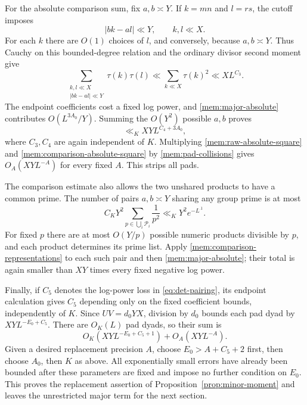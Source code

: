 For the absolute comparison sum, fix $a,b\asymp Y$. If $k=mn$ and
$l=rs$, the cutoff imposes
\[
 |bk-al|\ll Y,\qquad k,l\ll X.
\]
For each $k$ there are $O(1)$ choices of $l$, and conversely, because
$a,b\asymp Y$. Thus Cauchy on this bounded-degree relation and the
ordinary divisor second moment give
\begin{equation}\label{mem:comparison-representations}
 \sum_{\substack{k,l\ll X\\|bk-al|\ll Y}}\tau(k)\tau(l)
 \ll\sum_{k\ll X}\tau(k)^2\ll X L^{C_3}.
\end{equation}
The endpoint coefficients cost a fixed log power, and
\eqref{mem:major-absolute} contributes $O(L^{3A_0}/Y)$. Summing the
$O(Y^2)$ possible $a,b$ proves
\begin{equation}\label{mem:comparison-absolute-square}
 \ll_K XY L^{C_4+3A_0},
\end{equation}
where $C_3,C_4$ are again independent of $K$. Multiplying
\eqref{mem:raw-absolute-square} and
\eqref{mem:comparison-absolute-square} by
\eqref{mem:pad-collisions} gives $O_A(XY L^{-A})$ for every fixed
$A$. This strips all pads.

The comparison estimate also allows the two unshared products to have
a common prime.
The number of pairs $a,b\asymp Y$ sharing any group prime is at most
\begin{equation}\label{mem:unshared-collisions}
 C_KY^2\sum_{p\in\bigcup_i\mathcal P_i}\frac1{p^2}
       \ll_K Y^2e^{-L^{.1}}.
\end{equation}
For fixed $p$ there are at most $O(Y/p)$ possible numeric products
divisible by $p$, and each product determines its prime list.
Apply \eqref{mem:comparison-representations} to each such pair and
then \eqref{mem:major-absolute}; their total is again smaller than
$XY$ times every fixed negative log power.

Finally, if $C_5$ denotes the log-power loss in
\eqref{eq:det-pairing}, its endpoint calculation gives $C_5$ depending
only on the fixed coefficient bounds, independently of $K$.
Since $UV=d_0YX$, division by $d_0$ bounds each pad dyad by
$XY L^{-E_0+C_5}$. There are $O_K(L)$ pad dyads, so their sum is
\begin{equation}\label{mem:final-replacement}
 O_K(XY L^{-E_0+C_5+1})+O_A(XY L^{-A}).
\end{equation}
Given a desired replacement precision $A$, choose
$E_0>A+C_5+2$ first, then choose $A_0$, then $K$ as above.
All exponentially small errors have already been bounded after these
parameters are fixed and impose no further condition on $E_0$.
This proves the replacement assertion of
Proposition~\ref{prop:minor-moment} and leaves the unrestricted major
term for the next section.
